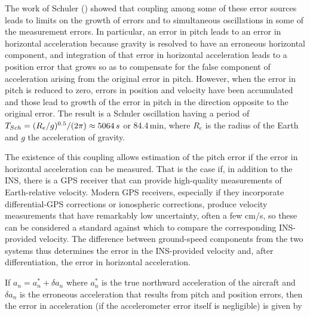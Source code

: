 \documentclass[12pt,twoside,english,12pt,twoside,english]{article}\usepackage[]{graphicx}\usepackage[]{color}
\let\OrgIndex\index
\renewcommand*{\index}[1]{\OrgIndex{#1}}
\begin{document}
The work of Schuler (\citet{Schuler1923})
showed that coupling among some of these error
sources leads to limits on the growth of errors and to simultaneous
oscillations in some of the measurement
errors. In particular, an error
in pitch leads to an error in horizontal acceleration
because gravity is resolved to have an erroneous horizontal
component, and integration of that
error in horizontal acceleration leads to a position error
that grows so as to compensate for the false component of acceleration
arising from the original error in pitch. However,
when the error in pitch is reduced to zero, errors in position and
velocity have been accumulated and those lead to growth of the error
in pitch in the direction opposite to the original error. The result
is a Schuler oscillation having a period
of $T_{Sch}=(R_{e}/g)^{0.5}/(2\pi)\approx5064\thinspace s$ or 84.4\,min,
where $R_{e}$ is the radius of the Earth
and $g$ the acceleration of gravity. 

The existence of this coupling allows estimation of the pitch error
if the error in horizontal acceleration can be measured. That is the
case if, in addition to the INS, there is a GPS
receiver that can provide high-quality measurements
of Earth-relative velocity.
Modern GPS receivers, especially if they incorporate differential-GPS
corrections or ionospheric corrections, produce velocity measurements
that have remarkably low uncertainty,
often a few cm/s, so these can be considered a standard against which
to compare the corresponding INS-provided velocity. The difference
between ground-speed components from the two
systems thus determines the error in the INS-provided
velocity and, after differentiation, the error
in horizontal acceleration.

If $a_{n}=a_{n}^{*}+\delta a_{n}$ where $a_{n}^{*}$ is the true
northward acceleration  of the aircraft
and $\delta a_{n}$ is the erroneous acceleration
that results from pitch and position errors, then the error in acceleration
(if the accelerometer error itself is negligible) is given by
\end{document}
